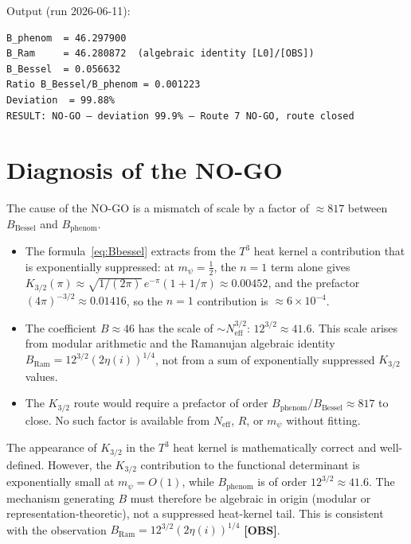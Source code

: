 \documentclass[12pt,a4paper]{article}
\theoremstyle{definition}
\theoremstyle{remark}
\newcommand{\OBS}{\textbf{[OBS]}}
\begin{document}
Output (run 2026-06-11):
\begin{verbatim}
B_phenom  = 46.297900
B_Ram     = 46.280872  (algebraic identity [L0]/[OBS])
B_Bessel  = 0.056632
Ratio B_Bessel/B_phenom = 0.001223
Deviation  = 99.88%
RESULT: NO-GO — deviation 99.9% — Route 7 NO-GO, route closed
\end{verbatim}

\section{Diagnosis of the NO-GO}
\label{sec:diagnosis}

The cause of the NO-GO is a mismatch of scale by a factor of $\approx 817$
between $B_{\mathrm{Bessel}}$ and $B_{\mathrm{phenom}}$.

\begin{itemize}
  \item The formula~\eqref{eq:Bbessel} extracts from the $T^3$ heat kernel
        a contribution that is exponentially suppressed: at $m_\psi = \tfrac12$,
        the $n=1$ term alone gives $K_{3/2}(\pi) \approx \sqrt{1/(2\pi)}\,e^{-\pi}(1+1/\pi)
        \approx 0.00452$, and the prefactor $(4\pi)^{-3/2} \approx 0.01416$,
        so the $n=1$ contribution is $\approx 6\times 10^{-4}$.

  \item The coefficient $B \approx 46$ has the scale of $\sim N_{\mathrm{eff}}^{3/2}$:
        $12^{3/2} \approx 41.6$.  This scale arises from modular arithmetic
        and the Ramanujan algebraic identity $B_{\mathrm{Ram}} = 12^{3/2}(2\eta(i))^{1/4}$,
        not from a sum of exponentially suppressed $K_{3/2}$ values.

  \item The $K_{3/2}$ route would require a prefactor of order
        $B_{\mathrm{phenom}} / B_{\mathrm{Bessel}} \approx 817$ to close.
        No such factor is available from $N_{\mathrm{eff}}$, $R$, or $m_\psi$
        without fitting.
\end{itemize}

\begin{insightbox}
The appearance of $K_{3/2}$ in the $T^3$ heat kernel is mathematically correct
and well-defined.  However, the $K_{3/2}$ contribution to the functional
determinant is exponentially small at $m_\psi = O(1)$, while $B_{\mathrm{phenom}}$
is of order $12^{3/2} \approx 41.6$.  The mechanism generating $B$ must therefore
be algebraic in origin (modular or representation-theoretic), not a suppressed
heat-kernel tail.  This is consistent with the observation $B_{\mathrm{Ram}} =
12^{3/2}(2\eta(i))^{1/4}$ \OBS{}.
\end{insightbox}
\end{document}
